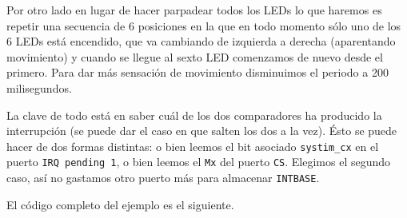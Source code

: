 Por otro lado en lugar de hacer parpadear todos los LEDs lo que haremos es repetir una
secuencia de 6 posiciones en la que en todo momento sólo uno de los 6 LEDs está encendido, que
va cambiando de izquierda a derecha (aparentando movimiento) y cuando se llegue al sexto LED
comenzamos de nuevo desde el primero. Para dar más sensación de movimiento disminuimos el periodo
a 200 milisegundos.

La clave de todo está en saber cuál de los dos comparadores ha producido la interrupción (se
puede dar el caso en que salten los dos a la vez). Ésto se puede hacer de dos formas distintas:
o bien leemos el bit asociado {\tt systim\_cx} en el puerto {\tt IRQ pending 1}, o bien leemos
el {\tt Mx} del puerto {\tt CS}. Elegimos el segundo caso, así no gastamos otro puerto más
para almacenar {\tt INTBASE}.

El código completo del ejemplo es el siguiente.


